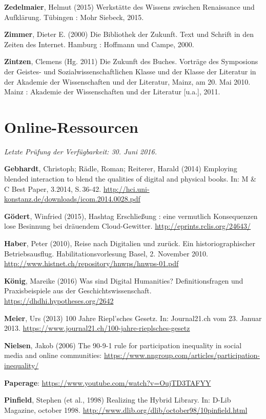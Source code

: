 \documentclass[a4paper,
fontsize=11pt,
oneside,
numbers=noperiodatend,
parskip=half-,
bibliography=totoc,
final
]{scrartcl}
\begin{document}
\textbf{Zedelmaier}, Helmut (2015) Werkstätte des Wissens zwischen
Renaissance und Aufklärung. Tübingen : Mohr Siebeck, 2015.

\textbf{Zimmer}, Dieter E. (2000) Die Bibliothek der Zukunft. Text und
Schrift in den Zeiten des Internet. Hamburg : Hoffmann und Campe, 2000.

\textbf{Zintzen}, Clemens (Hg. 2011) Die Zukunft des Buches. Vorträge
des Symposions der Geistes- und Sozialwissenschaftlichen Klasse und der
Klasse der Literatur in der Akademie der Wissenschaften und der
Literatur, Mainz, am 20. Mai 2010. Mainz : Akademie der Wissenschaften
und der Literatur {[}u.a.{]}, 2011.

\section*{Online-Ressourcen}\label{online-ressourcen}

\emph{Letzte Prüfung der Verfügbarkeit: 30. Juni 2016.}

\textbf{Gebhardt}, Christoph; Rädle, Roman; Reiterer, Harald (2014)
Employing blended interaction to blend the qualities of digital and
physical books. In: M \& C Best Paper, 3.2014, S.\,36-42.
\url{http://hci.uni-konstanz.de/downloads/icom.2014.0028.pdf}

\textbf{Gödert}, Winfried (2015), Hashtag Erschließung : eine vermutlich
Konsequenzen lose Besinnung bei dräuendem Cloud-Gewitter.
\url{http://eprints.rclis.org/24643/}

\textbf{Haber}, Peter (2010), Reise nach Digitalien und zurück. Ein
historiographischer Betriebsausflug. Habilitationsvorlesung Basel, 2.
November 2010. \url{http://www.histnet.ch/repository/hnwps/hnwps-01.pdf}

\textbf{König}, Mareike (2016) Was sind Digital Humanities?
Definitionsfragen und Praxisbeispiele aus der Geschichtswissenschaft.
\url{https://dhdhi.hypotheses.org/2642}

\textbf{Meier}, Urs (2013) 100 Jahre Riepl'sches Gesetz. In:
Journal21.ch vom 23. Januar 2013.
\url{https://www.journal21.ch/100-jahre-rieplsches-gesetz}

\textbf{Nielsen}, Jakob (2006) The 90-9-1 rule for participation
inequality in social media and online communities:
\url{https://www.nngroup.com/articles/participation-inequality/}

\textbf{Paperage}: \url{https://www.youtube.com/watch?v=OujTD3TAFYY}

\textbf{Pinfield}, Stephen (et al., 1998) Realizing the Hybrid Library.
In: D-Lib Magazine, october 1998.
\url{http://www.dlib.org/dlib/october98/10pinfield.html}
\end{document}
